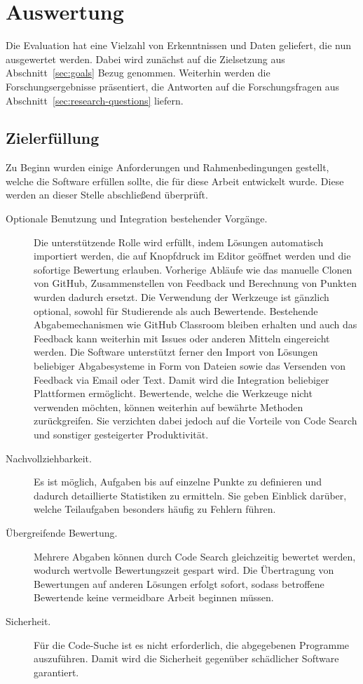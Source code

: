 \chapter{Auswertung}\label{ch:results}

Die Evaluation hat eine Vielzahl von Erkenntnissen und Daten geliefert, die nun ausgewertet werden.
Dabei wird zunächst auf die Zielsetzung aus Abschnitt~\ref{sec:goals} Bezug genommen.
Weiterhin werden die Forschungsergebnisse präsentiert, die Antworten auf die Forschungsfragen aus Abschnitt~\ref{sec:research-questions} liefern.

\section{Zielerfüllung}\label{sec:goals-reached}

Zu Beginn wurden einige Anforderungen und Rahmenbedingungen gestellt, welche die Software erfüllen sollte, die für diese Arbeit entwickelt wurde.
Diese werden an dieser Stelle abschließend überprüft.

\begin{description}
    \item[Optionale Benutzung und Integration bestehender Vorgänge.]
    Die unterstützende Rolle wird erfüllt, indem Lösungen automatisch importiert werden, die auf Knopfdruck im Editor geöffnet werden und die sofortige Bewertung erlauben.
    Vorherige Abläufe wie das manuelle Clonen von GitHub, Zusammenstellen von Feedback und Berechnung von Punkten wurden dadurch ersetzt.
    Die Verwendung der Werkzeuge ist gänzlich optional, sowohl für Studierende als auch Bewertende.
    Bestehende Abgabemechanismen wie GitHub Classroom bleiben erhalten und auch das Feedback kann weiterhin mit Issues oder anderen Mitteln eingereicht werden.
    Die Software unterstützt ferner den Import von Lösungen beliebiger Abgabesysteme in Form von Dateien sowie das Versenden von Feedback via Email oder Text.
    Damit wird die Integration beliebiger Plattformen ermöglicht.
    Bewertende, welche die Werkzeuge nicht verwenden möchten, können weiterhin auf bewährte Methoden zurückgreifen.
    Sie verzichten dabei jedoch auf die Vorteile von Code Search und sonstiger gesteigerter Produktivität.
    \item[Nachvollziehbarkeit.]
    Es ist möglich, Aufgaben bis auf einzelne Punkte zu definieren und dadurch detaillierte Statistiken zu ermitteln.
    Sie geben Einblick darüber, welche Teilaufgaben besonders häufig zu Fehlern führen.
    \item[Übergreifende Bewertung.]
    Mehrere Abgaben können durch Code Search gleichzeitig bewertet werden, wodurch wertvolle Bewertungszeit gespart wird.
    Die Übertragung von Bewertungen auf anderen Lösungen erfolgt sofort, sodass betroffene Bewertende keine vermeidbare Arbeit beginnen müssen.
    \item[Sicherheit.]
    Für die Code-Suche ist es nicht erforderlich, die abgegebenen Programme auszuführen.
    Damit wird die Sicherheit gegenüber schädlicher Software garantiert.
\end{description}


